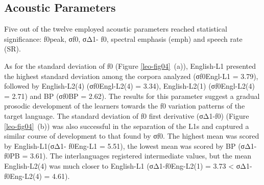 \subsection{Acoustic Parameters}
Five out of the twelve employed acoustic parameters reached statistical
significance: f0peak, σf0, σΔ1- f0, spectral emphasis (emph) and speech rate
(SR). 

As for the standard deviation of f0 (Figure \ref{leo-fig04}~(a)), English-L1 presented the
highest standard deviation among the corpora analyzed (σf0Engl-L1 = 3.79),
followed by English-L2(4) (σf0Engl-L2(4) = 3.34), English-L2(1) (σf0Engl-L2(4)
= 2.71) and BP (σf0BP  = 2.62). The results for this parameter suggest a
gradual prosodic development of the learners towards the f0 variation patterns
of the target language. The standard deviation of f0 first derivative (σΔ1-f0)
(Figure \ref{leo-fig04}~(b)) was also successful in the separation of the L1s and captured a
similar course of development to that found by σf0. The highest mean was scored
by English-L1(σΔ1- f0Eng-L1 = 5.51), the lowest mean was scored by BP (σΔ1-f0PB
= 3.61). The interlanguages registered intermediate values, but the mean
English-L2(4) was much closer to English-L1 (σΔ1-f0Eng-L2(1) = 3.73 <
σΔ1-f0Eng-L2(4) = 4.61).


